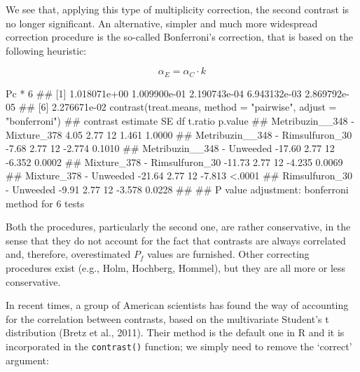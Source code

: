 \documentclass[a4paper,12pt,oneside]{book}
\newenvironment{Shaded}{\begin{snugshade}}{\end{snugshade}}
\newcommand{\DecValTok}[1]{#1}
\newcommand{\SpecialCharTok}[1]{#1}
\newcommand{\StringTok}[1]{#1}
\newcommand{\DocumentationTok}[1]{#1}
\newcommand{\FunctionTok}[1]{#1}
\newcommand{\AttributeTok}[1]{#1}
\newcommand{\NormalTok}[1]{#1}
\begin{document}
\normalsize

We see that, applying this type of multiplicity correction, the second contrast is no longer significant. An alternative, simpler and much more widespread correction procedure is the so-called Bonferroni's correction, that is based on the following heuristic:

\[\alpha_E = \alpha_C \cdot k\]

\begin{Shaded}
\begin{Highlighting}[]
\NormalTok{Pc }\SpecialCharTok{*} \DecValTok{6}
\DocumentationTok{\#\# [1] 1.018071e+00 1.009900e{-}01 2.190743e{-}04 6.943132e{-}03 2.869792e{-}05}
\DocumentationTok{\#\# [6] 2.276671e{-}02}
\FunctionTok{contrast}\NormalTok{(treat.means, }\AttributeTok{method =} \StringTok{"pairwise"}\NormalTok{, }\AttributeTok{adjust =} \StringTok{"bonferroni"}\NormalTok{)}
\DocumentationTok{\#\#  contrast                         estimate   SE df t.ratio p.value}
\DocumentationTok{\#\#  Metribuzin\_\_348 {-} Mixture\_378        4.05 2.77 12   1.461  1.0000}
\DocumentationTok{\#\#  Metribuzin\_\_348 {-} Rimsulfuron\_30    {-}7.68 2.77 12  {-}2.774  0.1010}
\DocumentationTok{\#\#  Metribuzin\_\_348 {-} Unweeded         {-}17.60 2.77 12  {-}6.352  0.0002}
\DocumentationTok{\#\#  Mixture\_378 {-} Rimsulfuron\_30       {-}11.73 2.77 12  {-}4.235  0.0069}
\DocumentationTok{\#\#  Mixture\_378 {-} Unweeded             {-}21.64 2.77 12  {-}7.813  \textless{}.0001}
\DocumentationTok{\#\#  Rimsulfuron\_30 {-} Unweeded           {-}9.91 2.77 12  {-}3.578  0.0228}
\DocumentationTok{\#\# }
\DocumentationTok{\#\# P value adjustment: bonferroni method for 6 tests}
\end{Highlighting}
\end{Shaded}

Both the procedures, particularly the second one, are rather conservative, in the sense that they do not account for the fact that contrasts are always correlated and, therefore, overestimated \(P_f\) values are furnished. Other correcting procedures exist (e.g., Holm, Hochberg, Hommel), but they are all more or less conservative.

In recent times, a group of American scientists has found the way of accounting for the correlation between contrasts, based on the multivariate Student's t distribution (Bretz et al., 2011). Their method is the default one in R and it is incorporated in the \texttt{contrast()} function; we simply need to remove the `correct' argument:
\end{document}
